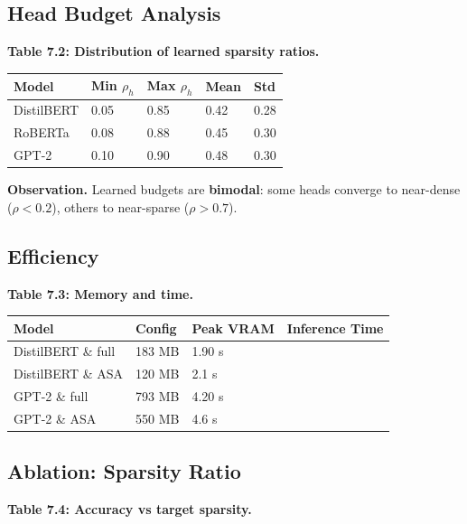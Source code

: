 \subsection{Head Budget Analysis}

\textbf{Table 7.2: Distribution of learned sparsity ratios.}

\begin{table}[H]
\centering
\small
\begin{tabular}{lllll}
\toprule
\textbf{Model} & \textbf{Min $\rho_h$} & \textbf{Max $\rho_h$} & \textbf{Mean} & \textbf{Std} \\
\midrule
DistilBERT & 0.05 & 0.85 & 0.42 & 0.28 \\
RoBERTa & 0.08 & 0.88 & 0.45 & 0.30 \\
GPT-2 & 0.10 & 0.90 & 0.48 & 0.30 \\
\bottomrule
\end{tabular}
\end{table}

\textbf{Observation.} Learned budgets are \textbf{bimodal}: some heads converge to 
near-dense ($\rho < 0.2$), others to near-sparse ($\rho > 0.7$).

\subsection{Efficiency}

\textbf{Table 7.3: Memory and time.}

\begin{table}[H]
\centering
\small
\begin{tabular}{llll}
\toprule
\textbf{Model} & \textbf{Config} & \textbf{Peak VRAM} & \textbf{Inference Time} \\
\midrule
DistilBERT \& full & 183 MB & 1.90 s \\
DistilBERT \& ASA & 120 MB & 2.1 s \\
GPT-2 \& full & 793 MB & 4.20 s \\
GPT-2 \& ASA & 550 MB & 4.6 s \\
\bottomrule
\end{tabular}
\end{table}

\subsection{Ablation: Sparsity Ratio}

\textbf{Table 7.4: Accuracy vs target sparsity.}

